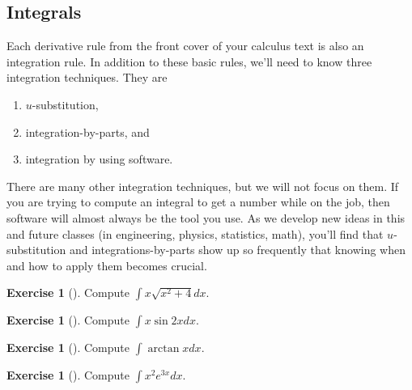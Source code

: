 \documentclass[10pt,]{book}
\theoremstyle{plain}
\theoremstyle{definition}
\theoremstyle{definition}
\theoremstyle{definition}
\theoremstyle{definition}
\newtheorem{exploration}[project]{Exercise}
\theoremstyle{definition}
\numberwithin{equation}{section}
\newcommand{\ds}{\displaystyle}
\begin{document}
\subsection[{Integrals}]{Integrals}\label{subsection-3}
Each derivative rule from the front cover of your calculus text is also an integration rule. In addition to these basic rules, we'll need to know three integration techniques. They are \leavevmode%
\begin{enumerate}
\item\hypertarget{li-9}{}{\(u\)}-substitution,%
\item\hypertarget{li-10}{}integration-by-parts, and%
\item\hypertarget{li-11}{}integration by using software.%
\end{enumerate}
%
\par
There are many other integration techniques, but we will not focus on them. If you are trying to compute an integral to get a number while on the job, then software will almost always be the tool you use. As we develop new ideas in this and future classes (in engineering, physics, statistics, math), you'll find that \(u\)-substitution and integrations-by-parts show up so frequently that knowing when and how to apply them becomes crucial.%
\begin{exploration}[]\label{exploration-5}
Compute \(\ds\int x\sqrt{x^2+4}dx\).%
\end{exploration}
\begin{exploration}[]\label{exploration-6}
Compute \(\ds\int x\sin 2x dx\).%
\end{exploration}
\begin{exploration}[]\label{exploration-7}
Compute \(\ds \int \arctan x dx\).%
\end{exploration}
\begin{exploration}[]\label{exploration-8}
Compute \(\ds \int x^2 e^{3x} dx\).%
\end{exploration}
\typeout{************************************************}
\typeout{************************************************}
\end{document}

